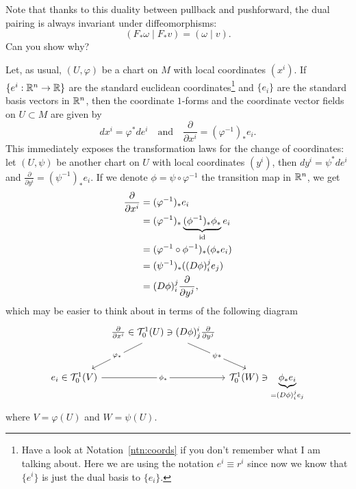 Note that thanks to this duality between pullback and pushforward, the dual pairing is always invariant under diffeomorphisms:
\begin{equation}\label{eq:pairdualitypull}
  (F_* \omega \mid F_* v) = (\omega \mid v).
\end{equation}
Can you show why?

\begin{example}
  Let, as usual, $(U,\varphi)$ be a chart on $M$ with local coordinates $(x^i)$.
  If $\{e^i:\mathbb{R}^n\to\mathbb{R}\}$ are the standard euclidean coordinates\footnote{Have a look at Notation~\ref{ntn:coords} if you don't remember what I am talking about.
  Here we are using the notation $e^i \equiv r^i$ since now we know that $\{e^i\}$ is just the dual basis to $\{e_i\}$. } and $\{e_i\}$ are the standard basis vectors in $\mathbb{R}^n$, then the coordinate $1$-forms and the coordinate vector fields on $U\subset M$ are given by
  \begin{equation}
    dx^i = \varphi^* de^i
    \quad\mbox{and}\quad
    \frac{\partial}{\partial x^i} = (\varphi^{-1})_* e_i.
  \end{equation}
  This immediately exposes the transformation laws for the change of coordinates: let $(U, \psi)$ be another chart on $U$ with local coordinates $(y^i)$, then $dy^i = \psi^* de^i$ and $\frac{\partial}{\partial y^i} = (\psi^{-1})_* e_i$. If we denote $\phi = \psi\circ\varphi^{-1}$ the transition map in $\mathbb{R}^n$, we get
  \begin{align}
    \frac{\partial}{\partial x^i} &= (\varphi^{-1})_* e_i \\
    &= (\varphi^{-1})_* \LaTeXunderbrace{(\phi^{-1})_*\phi_*}_{\id} e_i \\
    &= (\varphi^{-1}\circ \phi^{-1})_* (\phi_* e_i) \\
    &= (\psi^{-1})_* ((D\phi)_i^j e_j) \\
    &= (D\phi)_i^j \frac{\partial}{\partial y^j},
  \end{align}
  which may be easier to think about in terms of the following diagram
  \begin{equation}\nonumber
    \begin{tikzcd}[row sep=large, column sep=tiny]
      & \frac{\partial}{\partial x^i} \in \cT_0^1(U) \ni (D\phi)_j^i \frac{\partial}{\partial y^j} \arrow[dl, "\varphi_*" description] \arrow[dr, "\psi*" description] & \\
      e_i \in \cT_0^1(V) \arrow[rr, "\phi_*" description] & & \cT_0^1(W) \ni \LaTeXunderbrace{\phi_* e_i}_{= (D\phi)_i^j e_j}
    \end{tikzcd}
  \end{equation}
  where $V = \varphi(U)$ and $W = \psi(U)$.


\end{example}
